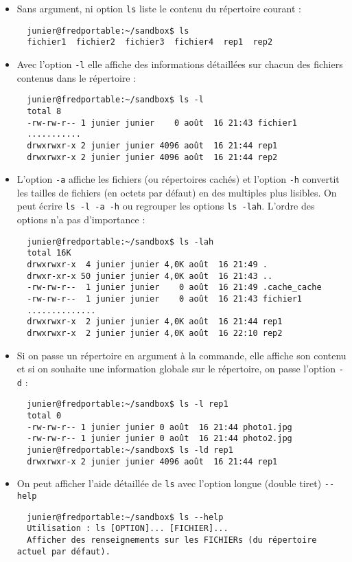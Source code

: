 \documentclass[
  11pt,
]{article}
\begin{document}
\begin{itemize}
\item
  Sans argument, ni option \texttt{ls} liste le contenu du répertoire
  courant :

\begin{verbatim}
  junier@fredportable:~/sandbox$ ls
  fichier1  fichier2  fichier3  fichier4  rep1  rep2  
\end{verbatim}
\item
  Avec l'option \texttt{-l} elle affiche des informations détaillées sur
  chacun des fichiers contenus dans le répertoire :

\begin{verbatim}
  junier@fredportable:~/sandbox$ ls -l
  total 8
  -rw-rw-r-- 1 junier junier    0 août  16 21:43 fichier1
  ...........
  drwxrwxr-x 2 junier junier 4096 août  16 21:44 rep1
  drwxrwxr-x 2 junier junier 4096 août  16 21:44 rep2
\end{verbatim}
\item
  L'option \texttt{-a} affiche les fichiers (ou répertoires cachés) et
  l'option \texttt{-h} convertit les tailles de fichiers (en octets par
  défaut) en des multiples plus lisibles. On peut écrire
  \texttt{ls\ -l\ -a\ -h} ou regrouper les options \texttt{ls\ -lah}.
  L'ordre des options n'a pas d'importance :

\begin{verbatim}
  junier@fredportable:~/sandbox$ ls -lah
  total 16K
  drwxrwxr-x  4 junier junier 4,0K août  16 21:49 .
  drwxr-xr-x 50 junier junier 4,0K août  16 21:43 ..
  -rw-rw-r--  1 junier junier    0 août  16 21:49 .cache_cache
  -rw-rw-r--  1 junier junier    0 août  16 21:43 fichier1
  ..............
  drwxrwxr-x  2 junier junier 4,0K août  16 21:44 rep1
  drwxrwxr-x  2 junier junier 4,0K août  16 22:10 rep2
\end{verbatim}
\item
  Si on passe un répertoire en argument à la commande, elle affiche son
  contenu et si on souhaite une information globale sur le répertoire,
  on passe l'option \texttt{-d} :

\begin{verbatim}
  junier@fredportable:~/sandbox$ ls -l rep1
  total 0
  -rw-rw-r-- 1 junier junier 0 août  16 21:44 photo1.jpg
  -rw-rw-r-- 1 junier junier 0 août  16 21:44 photo2.jpg
  junier@fredportable:~/sandbox$ ls -ld rep1
  drwxrwxr-x 2 junier junier 4096 août  16 21:44 rep1
\end{verbatim}
\item
  On peut afficher l'aide détaillée de \texttt{ls} avec l'option longue
  (double tiret) \texttt{-\/-help}

\begin{verbatim}
  junier@fredportable:~/sandbox$ ls --help
  Utilisation : ls [OPTION]... [FICHIER]...
  Afficher des renseignements sur les FICHIERs (du répertoire actuel par défaut).
\end{verbatim}
\end{itemize}
\end{document}
